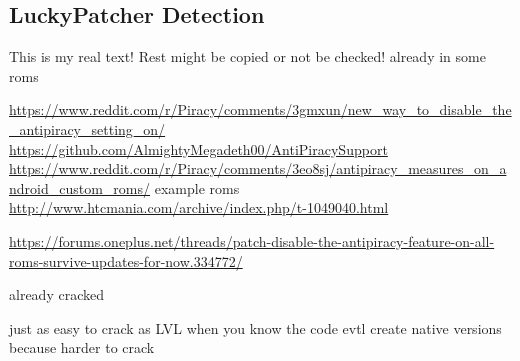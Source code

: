 \subsection{LuckyPatcher Detection} \label{subsection:evaluation-tampering-luckypatcher}
This is my real text! Rest might be copied or not be checked!
already in some roms

 \url{https://www.reddit.com/r/Piracy/comments/3gmxun/new_way_to_disable_the_antipiracy_setting_on/}\newline
\url{https://github.com/AlmightyMegadeth00/AntiPiracySupport}\newline
\url{https://www.reddit.com/r/Piracy/comments/3eo8sj/antipiracy_measures_on_android_custom_roms/}\newline
example roms \url{http://www.htcmania.com/archive/index.php/t-1049040.html}\newline

\url{https://forums.oneplus.net/threads/patch-disable-the-antipiracy-feature-on-all-roms-survive-updates-for-now.334772/}

already cracked

just as easy to crack as LVL when you know the code\newline
evtl create native versions because harder to crack\newline
